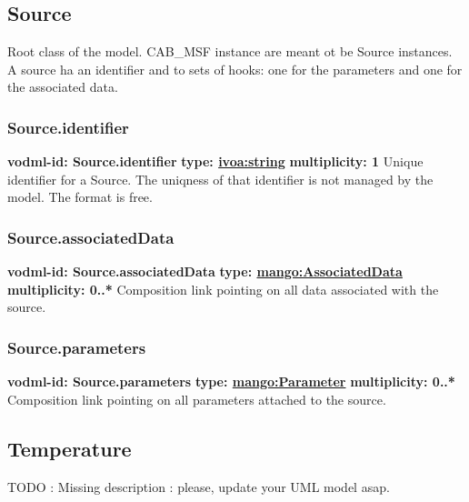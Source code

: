   \subsection{Source}
  \label{sect:Source}
    Root class of the model. CAB\_MSF instance are meant ot be Source instances. A source ha an identifier and to sets of hooks: one for the parameters and one for the associated data.

    \subsubsection{Source.identifier}
      \textbf{vodml-id: Source.identifier} \newline
      \textbf{type: \hyperref[sect:ivoa]{ivoa:string}} \newline
      \textbf{multiplicity: 1} \newline 
      Unique identifier for a Source. The uniqness of that identifier is not managed by the model. The format is free.

    \subsubsection{Source.associatedData}
      \textbf{vodml-id: Source.associatedData} \newline
      \textbf{type: \hyperref[sect:AssociatedData]{mango:AssociatedData}} \newline
      \textbf{multiplicity: 0..*} \newline 
      Composition link pointing on all data associated with the source.

    \subsubsection{Source.parameters}
      \textbf{vodml-id: Source.parameters} \newline
      \textbf{type: \hyperref[sect:Parameter]{mango:Parameter}} \newline
      \textbf{multiplicity: 0..*} \newline 
      Composition link pointing on all parameters attached to the source.

  \subsection{Temperature}
  \label{sect:Temperature}
    TODO : Missing description : please, update your UML model asap.


